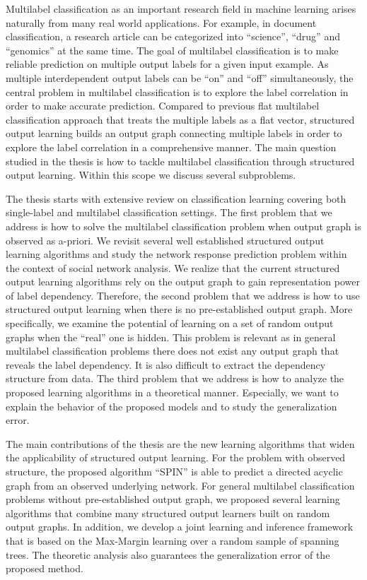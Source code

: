 \documentclass[10pt]{article}
\begin{document}
\setlength{\parindent}{3mm}
\small

\noindent Multilabel classification as an important research field in machine learning arises naturally from many real world applications. For example, in document classification, a research article can be categorized into ``science'', ``drug'' and ``genomics'' at the same time. The goal of multilabel classification is to make reliable prediction on multiple output labels for a given input example. As multiple interdependent output labels can be ``on'' and ``off'' simultaneously, the central problem in multilabel classification is to explore the label correlation in order to make accurate prediction. Compared to previous flat multilabel classification approach that treats the multiple labels as a flat vector, structured output learning builds an output graph connecting multiple labels in order to explore the label correlation in a comprehensive manner. The main question studied in the thesis is how to tackle multilabel classification through structured output learning. Within this scope we discuss several subproblems.

The thesis starts with extensive review on classification learning covering both single-label and multilabel classification settings. The first problem that we address is how to solve the multilabel classification problem when output graph is observed as a-priori. We revisit several well established structured output learning algorithms and study the network response prediction problem within the context of social network analysis. We realize that the current structured output learning algorithms rely on the output graph to gain representation power of label dependency. Therefore, the second problem that we address is how to use structured output learning when there is no pre-established output graph. More specifically, we examine the potential of learning on a set of random output graphs when the ``real'' one is hidden. This problem is relevant as in general multilabel classification problems there does not exist any output graph that reveals the label dependency. It is also difficult to extract the dependency structure from data. The third problem that we address is how to analyze the proposed learning algorithms in a theoretical manner. Especially, we want to explain the behavior of the proposed models and to study the generalization error.

The main contributions of the thesis are the new learning algorithms that widen the applicability of structured output learning. For the problem with observed structure, the proposed algorithm ``SPIN'' is able to predict a directed acyclic graph from an observed underlying network. For general multilabel classification problems without pre-established output graph, we proposed several learning algorithms that combine many structured output learners built on random output graphs. In addition, we develop a joint learning and inference framework that is based on the Max-Margin learning over a random sample of spanning trees. The theoretic analysis also guarantees the generalization error of the proposed method.
\end{document}
